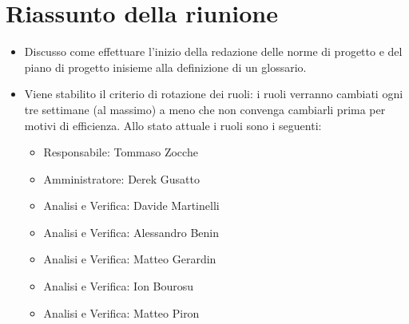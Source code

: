 \section{Riassunto della riunione}
\begin{itemize}
    \item Discusso come effettuare l'inizio della redazione delle norme di progetto e del piano di progetto inisieme alla definizione di un glossario.
    \item Viene stabilito il criterio di rotazione dei ruoli: i ruoli verranno cambiati ogni tre settimane (al massimo) a meno che non convenga cambiarli prima per motivi di efficienza.
    Allo stato attuale i ruoli sono i seguenti:
    \begin{itemize}
        \item Responsabile: Tommaso Zocche
        \item Amministratore: Derek Gusatto
        \item Analisi e Verifica: Davide Martinelli
        \item Analisi e Verifica: Alessandro Benin
        \item Analisi e Verifica: Matteo Gerardin
        \item Analisi e Verifica: Ion Bourosu
        \item Analisi e Verifica: Matteo Piron
    \end{itemize}

\end{itemize}